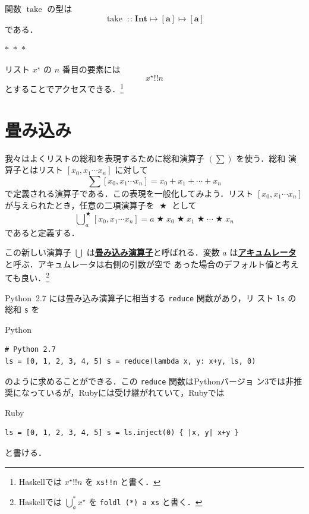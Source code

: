 \documentclass[a5paper,twoside,fleqn,draft]{jsbook}
\newcommand{\separator}{\begin{center}$*$~$*$~$*$\end{center}}
\newcommand{\programminglanguage}[1]{\textsf{#1}}
\newcommand{\haskell}{\programminglanguage{Haskell}}
\newcommand{\python}{\programminglanguage{Python}}
\newcommand{\ruby}{\programminglanguage{Ruby}}
\newcommand{\keyword}[1]{{\underline{\textbf{#1}}}}
\newcommand{\code}[1]{\texttt{#1}}
\newenvironment{pythoncode}{\begin{itembox}[r]{\python}}{\end{itembox}}
\newenvironment{rubycode}{\begin{itembox}[r]{\ruby}}{\end{itembox}}
\newcommand{\mSpecialFunc}[1]{\mathrm{#1}}
\DeclareMathOperator{\mTake}{\mSpecialFunc{take}}
\DeclareMathOperator{\mBinOp}{\bigstar}
\DeclareMathOperator*{\mFold}{\bigcup}
\DeclareMathOperator{\mIn}{{:\!:}}
\DeclareMathOperator{\mListAt}{!!}
\DeclareMathOperator{\mMapsTo}{\mapsto}
\newcommand{\mType}[1]{\mathbf{#1}}
\newcommand{\mIntType}{\mType{Int}}
\newcommand{\mListType}[1]{[\mType{#1}]}
\newcommand{\mListWith}[1]{\left[#1\right]}
\newcommand{\mList}[1]{{#1}^\mathrm{\star}}
\newcommand{\mProj}[2]{#1\mMapsTo#2}
\begin{document}
関数 $\mTake$ の型は
\begin{equation}
\mTake\mIn{}\mProj{\mIntType}{\mProj{\mListType{a}}{\mListType{a}}}
\end{equation}
である．

\separator

リスト $\mList{x}$ の $n$ 番目の要素には
\begin{equation}
\mList{x}\mListAt n
\end{equation}
とすることでアクセスできる．\footnote{\haskell では $\mList{x}\mListAt
n$ を \code{xs!!n} と書く．}

\section{畳み込み}
\label{sec:convolution}

我々はよくリストの総和を表現するために総和演算子 $(\sum)$ を使う．総和
演算子とはリスト $\mListWith{x_0,x_1\dotsb x_n}$ に対して
\begin{equation}
\sum\mListWith{x_0,x_1\dotsb x_n}=x_0+x_1+\dotsb+x_n
\end{equation}
で定義される演算子である．この表現を一般化してみよう．リスト
$\mListWith{x_0,x_1\dotsb x_n}$ が与えられたとき，任意の二項演算子を
$\mBinOp$ として
\begin{equation}
\mFold^{\mBinOp}_a\mListWith{x_0,x_1\dotsb x_n} =a\mBinOp x_0\mBinOp
x_1\mBinOp\dotsb\mBinOp x_n
\end{equation}
であると定義する．

この新しい演算子 $\mFold$ は\keyword{畳み込み演算子}と呼ばれる．変数
$a$ は\keyword{アキュムレータ}と呼ぶ．アキュムレータは右側の引数が空で
あった場合のデフォルト値と考えても良い．\footnote{\haskell では
  $\mFold^*_a\mList{x}$ を \code{foldl (*) a xs} と書く．}

\python\ 2.7 には畳み込み演算子に相当する \code{reduce} 関数があり，リ
スト \code{ls} の総和 \code{s} を
\begin{pythoncode}
\begin{verbatim}
# Python 2.7
ls = [0, 1, 2, 3, 4, 5] s = reduce(lambda x, y: x+y, ls, 0)
\end{verbatim}
\end{pythoncode}
のように求めることができる．この \code{reduce} 関数は\python バージョ
ン3では非推奨になっているが，\ruby には受け継がれていて，\ruby では
\begin{rubycode}
\begin{verbatim}
ls = [0, 1, 2, 3, 4, 5] s = ls.inject(0) { |x, y| x+y }
\end{verbatim}
\end{rubycode}
と書ける．
\end{document}
